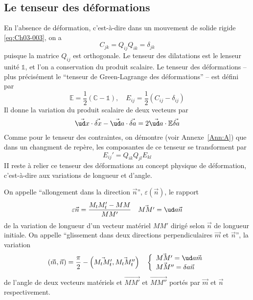 \subsection{Le tenseur des déformations} \label{ssec:Ch03-1.2}
En l'absence de déformation, c'est-à-dire dans un mouvement de solide rigide \eqref{eq:Ch03-003}, on a
\begin{equation}
    C_{jk} = Q_{ij} Q_{ik} = \delta_{jk}
    \label{eq:Ch03-009}
\end{equation}
puisque la matrice $Q_{ij}$ est orthogonale.
Le tenseur des dilatations est le lenseur unité $\mathbb{1}$, et l'on a conservation du produit scalaire.
Le tenseur des déformations -- plus précisément le ``tenseur de Green-Lagrange des déformations'' -- est défini par
\begin{equation}
    \mathbb{E} = \frac{1}{2} \left( \mathbb{C} - \mathbb{1} \right), \quad E_{ij} = \frac{1}{2} \left( C_{ij} - \delta_{ij} \right)
    \label{eq:Ch03-010}
\end{equation}
Il donne la variation du produit scalaire de deux vecteurs par
\begin{equation}
    \vec{\ud x} \cdot \vec{\delta x} - \vec{\ud a} \cdot \vec{\delta a} = 2 \vec{\ud a} \cdot \mathbb{E} \vec{\delta a}
    \label{eq:Ch03-011}
\end{equation}
Comme pour le tenseur des contraintes, on démontre (voir Annexe~\ref{Ann:A}) que  dans  un  changment de repère, les composantes de  ce tenseur se transforment par
\begin{equation}
    E_{ij}' = Q_{ik} Q_{jl} E_{kl}
    \label{eq:Ch03-012}
\end{equation}
II reste à relier ce tenseur des déformations au concept physique de déformation, c'est-à-dire aux variations de longueur et d'angle.
\begin{defn}
    On appelle ``allongement dans la direction $\vec{n}$'', $\varepsilon \left( \vec{n} \right)$, le rapport
    \begin{equation}
        \varepsilon \vec{n} = \frac{M_tM_t' -MM}{MM'} \quad \vec{MM'} = \ud a \vec{n}
        \label{eq:Ch03-013}
    \end{equation}
    de la variation de longueur d'un vecteur matériel $MM'$ dirigé selon $\vec{n}$ de longueur initiale.
    On appelle ``glissement dans deux directions perpendiculaires $\vec{m}$ et $\vec{n}$'', la variation
    \begin{equation}
        \left( \vec{m}, \vec{n} \right) = \frac{\pi}{2} - \left( \vec{M_t M_t'}, \vec{M_tM_t''} \right) 
        \quad \left\{
        \begin{array}{l}
            \vec{MM'} = \ud a \vec{m} \\
            \vec{MM''} = \delta a \vec{n}
        \end{array}
        \right.
        \label{eq:Ch03-014}
    \end{equation}
    de l'angle de deux vecteurs matériels et $\vec{MM'}$ et $\vec{MM''}$ port\'es par $\vec{m}$ et $\vec{n}$ respectivement.
\end{defn}
